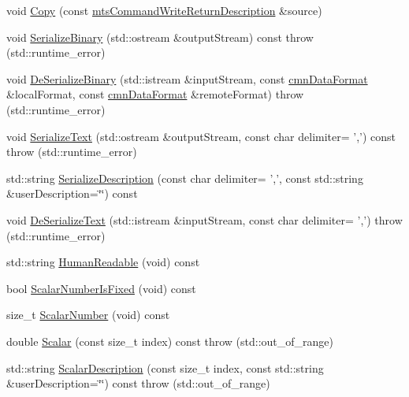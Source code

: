 \begin{DoxyCompactItemize}
\item 
void \hyperlink{classmts_command_write_return_description_ac843d60042514ae3e232c5b6d3214e18}{Copy} (const \hyperlink{classmts_command_write_return_description}{mts\-Command\-Write\-Return\-Description} \&source)
\item 
void \hyperlink{classmts_command_write_return_description_a0325349aa3f02f9bf3592ad76be72186}{Serialize\-Binary} (std\-::ostream \&output\-Stream) const   throw (std\-::runtime\-\_\-error)
\item 
void \hyperlink{classmts_command_write_return_description_af24b18353236f996c6977a65a8739513}{De\-Serialize\-Binary} (std\-::istream \&input\-Stream, const \hyperlink{classcmn_data_format}{cmn\-Data\-Format} \&local\-Format, const \hyperlink{classcmn_data_format}{cmn\-Data\-Format} \&remote\-Format)  throw (std\-::runtime\-\_\-error)
\item 
void \hyperlink{classmts_command_write_return_description_a12e8a5e1313ec3f4203d211b9c3eca5a}{Serialize\-Text} (std\-::ostream \&output\-Stream, const char delimiter= ',') const   throw (std\-::runtime\-\_\-error)
\item 
std\-::string \hyperlink{classmts_command_write_return_description_a96a855e68e08197a1f932f7af1af40c6}{Serialize\-Description} (const char delimiter= ',', const std\-::string \&user\-Description=\char`\"{}\char`\"{}) const 
\item 
void \hyperlink{classmts_command_write_return_description_ad19f858bf83e99218240a0b92e021504}{De\-Serialize\-Text} (std\-::istream \&input\-Stream, const char delimiter= ',')  throw (std\-::runtime\-\_\-error)
\item 
std\-::string \hyperlink{classmts_command_write_return_description_a06eb61699b970435123a66cbd919698e}{Human\-Readable} (void) const 
\item 
bool \hyperlink{classmts_command_write_return_description_a1fe3785c2eb535bc63e9078454b434a4}{Scalar\-Number\-Is\-Fixed} (void) const 
\item 
size\-\_\-t \hyperlink{classmts_command_write_return_description_aee859e14f5b248e7a309448d645a0124}{Scalar\-Number} (void) const 
\item 
double \hyperlink{classmts_command_write_return_description_aec41d51c390e02262186155e2a2d3feb}{Scalar} (const size\-\_\-t index) const   throw (std\-::out\-\_\-of\-\_\-range)
\item 
std\-::string \hyperlink{classmts_command_write_return_description_ab83991d601f3595992ab455b98bd29b0}{Scalar\-Description} (const size\-\_\-t index, const std\-::string \&user\-Description=\char`\"{}\char`\"{}) const   throw (std\-::out\-\_\-of\-\_\-range)
\end{DoxyCompactItemize}
